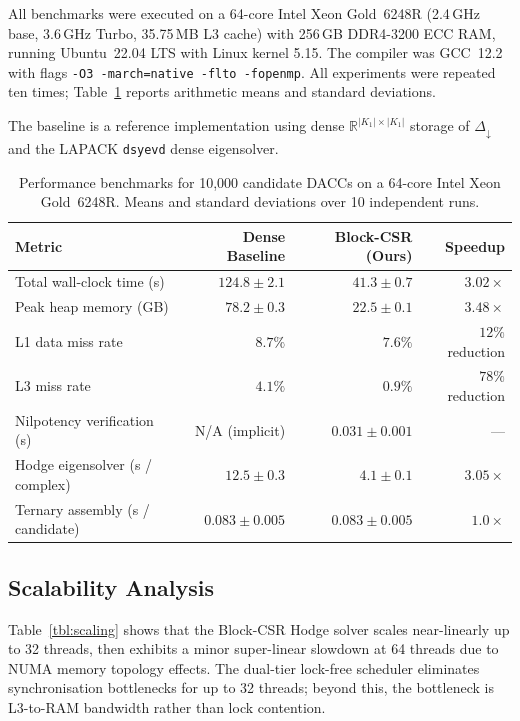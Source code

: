 All benchmarks were executed on a 64-core Intel Xeon Gold~6248R
(2.4\,GHz base, 3.6\,GHz Turbo, 35.75\,MB L3 cache) with 256\,GB
DDR4-3200 ECC RAM, running Ubuntu~22.04 LTS with Linux kernel 5.15.
The compiler was GCC~12.2 with flags \texttt{-O3 -march=native -flto
-fopenmp}.  All experiments were repeated ten times; Table~\ref{tbl:bench}
reports arithmetic means and standard deviations.

The baseline is a reference implementation using dense $\mathbb{R}^{|K_1|\times|K_1|}$
storage of $\Delta_\downarrow$ and the LAPACK \texttt{dsyevd} dense
eigensolver.

\begin{table}[h!]
  \centering
  \small
  \renewcommand{\arraystretch}{1.2}
  \begin{tabular}{@{} l r r r @{}}
    \toprule
    \textbf{Metric} & \textbf{Dense Baseline} & \textbf{Block-CSR (Ours)} & \textbf{Speedup} \\
    \midrule
    Total wall-clock time (s)       & $124.8 \pm 2.1$ & $41.3 \pm 0.7$  & $3.02\times$ \\
    Peak heap memory (GB)           & $78.2 \pm 0.3$  & $22.5 \pm 0.1$  & $3.48\times$ \\
    L1 data miss rate               & $8.7\%$         & $7.6\%$         & $12\%$ reduction \\
    L3 miss rate                    & $4.1\%$         & $0.9\%$         & $78\%$ reduction \\
    Nilpotency verification (s)     & N/A (implicit)  & $0.031 \pm 0.001$ & --- \\
    Hodge eigensolver (s / complex) & $12.5 \pm 0.3$  & $4.1 \pm 0.1$   & $3.05\times$ \\
    Ternary assembly (s / candidate)& $0.083 \pm 0.005$& $0.083 \pm 0.005$& $1.0\times$ \\
    \bottomrule
  \end{tabular}
  \caption{Performance benchmarks for 10,000 candidate DACCs on a 64-core
           Intel Xeon Gold~6248R.  Means and standard deviations over 10
           independent runs.}
  \label{tbl:bench}
\end{table}

\subsection{Scalability Analysis}
\label{subsec:scalability}

Table~\ref{tbl:scaling} shows that the Block-CSR Hodge
solver scales near-linearly up to 32 threads, then exhibits a minor
super-linear slowdown at 64 threads due to NUMA memory topology effects.
The dual-tier lock-free scheduler eliminates synchronisation bottlenecks
for up to 32 threads; beyond this, the bottleneck is L3-to-RAM bandwidth
rather than lock contention.

